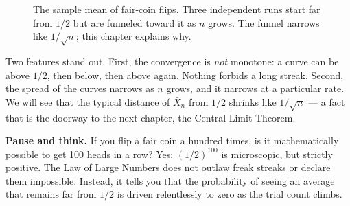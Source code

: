 \begin{figure}[H]
\centering
{}
\caption{The sample mean of fair-coin flips. Three independent runs start far from $1/2$ but are funneled toward it as $n$ grows. The funnel narrows like $1/\sqrt n$; this chapter explains why.}
\label{ch20:fig-running-mean}
\end{figure}

Two features stand out. First, the convergence is \emph{not} monotone: a curve can be above $1/2$, then below, then above again. Nothing forbids a long streak. Second, the spread of the curves narrows as $n$ grows, and it narrows at a particular rate. We will see that the typical distance of $\bar X_n$ from $1/2$ shrinks like $1/\sqrt n$ --- a fact that is the doorway to the next chapter, the Central Limit Theorem.

\begin{recoverybox}
\textbf{Pause and think.} If you flip a fair coin a hundred times, is it mathematically possible to get 100 heads in a row? Yes: $(1/2)^{100}$ is microscopic, but strictly positive. The Law of Large Numbers does not outlaw freak streaks or declare them impossible. Instead, it tells you that the probability of seeing an average that remains far from $1/2$ is driven relentlessly to zero as the trial count climbs.
\end{recoverybox}


